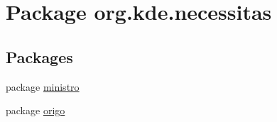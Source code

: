 \hypertarget{namespaceorg_1_1kde_1_1necessitas}{\section{Package org.\-kde.\-necessitas}
\label{d7/d00/namespaceorg_1_1kde_1_1necessitas}
}
\subsection*{Packages}
\begin{DoxyCompactItemize}
\item 
package \hyperlink{namespaceorg_1_1kde_1_1necessitas_1_1ministro}{ministro}
\item 
package \hyperlink{namespaceorg_1_1kde_1_1necessitas_1_1origo}{origo}
\end{DoxyCompactItemize}
